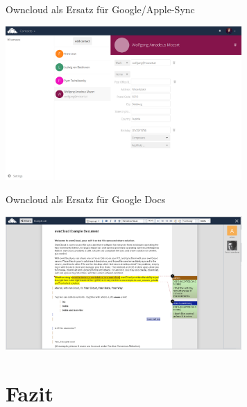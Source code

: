\documentclass[12pt, xcolor={svgnames,table}]{beamer}
\begin{document}
\begin{frame}{Owncloud als Ersatz für Google/Apple-Sync}
  \begin{center}
    \includegraphics[width=9cm]{img/owncloud-contacts.png}
  \end{center}
\end{frame}

\begin{frame}{Owncloud als Ersatz für Google Docs}
  \begin{center}
    \includegraphics[width=9cm]{img/owncloud-documents.png}
  \end{center}
\end{frame}

\section{Fazit}
\subsection{}
\end{document}
